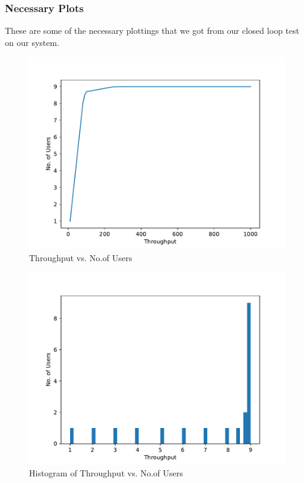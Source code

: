 \documentclass[11pt]{article}
\begin{document}
			\subsubsection{Necessary Plots}
				These are some of the necessary plottings that we got from our closed loop test on our system.
				\begin{figure}[h]
					\begin{center}
						\includegraphics[scale=0.5]{plot1.pdf}
						\caption{\label{fig:plot1} Throughput vs. No.of Users}
					\end{center}
				\end{figure}		
				\begin{figure}[ht]
					\begin{center}
						\includegraphics[scale=0.5]{plot2.pdf}
						\caption{\label{fig:plot2} Histogram of Throughput vs. No.of Users}
					\end{center}
				\end{figure}
\end{document}
